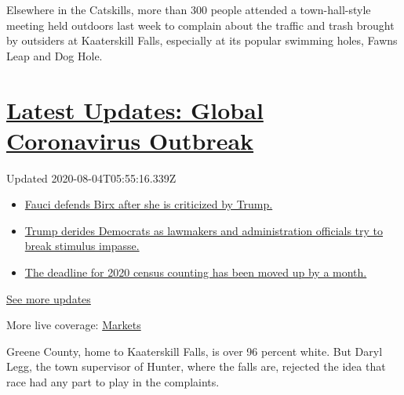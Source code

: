 Elsewhere in the Catskills, more than 300 people attended a
town-hall-style meeting held outdoors last week to complain about the
traffic and trash brought by outsiders at Kaaterskill Falls, especially
at its popular swimming holes, Fawns Leap and Dog Hole.

\hypertarget{latest-updates-global-coronavirus-outbreak}{%
\section{\texorpdfstring{\href{https://www.nytimes.com/2020/08/03/world/coronavirus-covid-19.html?action=click\&pgtype=Article\&state=default\&region=MAIN_CONTENT_1\&context=storylines_live_updates}{Latest
Updates: Global Coronavirus
Outbreak}}{Latest Updates: Global Coronavirus Outbreak}}\label{latest-updates-global-coronavirus-outbreak}}

Updated 2020-08-04T05:55:16.339Z

\begin{itemize}
\tightlist
\item
  \href{https://www.nytimes.com/2020/08/03/world/coronavirus-covid-19.html?action=click\&pgtype=Article\&state=default\&region=MAIN_CONTENT_1\&context=storylines_live_updates\#link-4547638f}{Fauci
  defends Birx after she is criticized by Trump.}
\item
  \href{https://www.nytimes.com/2020/08/03/world/coronavirus-covid-19.html?action=click\&pgtype=Article\&state=default\&region=MAIN_CONTENT_1\&context=storylines_live_updates\#link-15e7f995}{Trump
  derides Democrats as lawmakers and administration officials try to
  break stimulus impasse.}
\item
  \href{https://www.nytimes.com/2020/08/03/world/coronavirus-covid-19.html?action=click\&pgtype=Article\&state=default\&region=MAIN_CONTENT_1\&context=storylines_live_updates\#link-e5a2cda}{The
  deadline for 2020 census counting has been moved up by a month.}
\end{itemize}

\href{https://www.nytimes.com/2020/08/03/world/coronavirus-covid-19.html?action=click\&pgtype=Article\&state=default\&region=MAIN_CONTENT_1\&context=storylines_live_updates}{See
more updates}

More live coverage:
\href{https://www.nytimes.com/live/2020/08/03/business/stock-market-today-coronavirus?action=click\&pgtype=Article\&state=default\&region=MAIN_CONTENT_1\&context=storylines_live_updates}{Markets}

Greene County, home to Kaaterskill Falls, is over 96 percent white. But
Daryl Legg, the town supervisor of Hunter, where the falls are, rejected
the idea that race had any part to play in the complaints.

